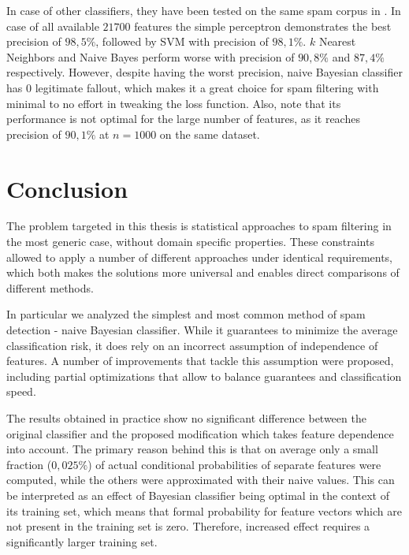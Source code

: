 \documentclass[12pt]{report}
\begin{document}
In case of other classifiers, they have been tested on the same spam corpus in \cite{Tretyakov}. In case of all available $21700$ features the simple perceptron demonstrates the best precision of $98,5\%$, followed by SVM with precision of $98,1\%$. $k$ Nearest Neighbors and Naive Bayes perform worse with precision of $90,8\%$ and $87,4\%$ respectively. However, despite having the worst precision, naive Bayesian classifier has $0$ legitimate fallout, which makes it a great choice for spam filtering with minimal to no effort in tweaking the loss function. Also, note that its performance is not optimal for the large number of features, as it reaches precision of $90,1\%$ at $n = 1000$ on the same dataset.

\newpage


\chapter*{Conclusion}

The problem targeted in this thesis is statistical approaches to spam filtering in the most generic case, without domain specific properties. These constraints allowed to apply a number of different approaches under identical requirements, which both makes the solutions more universal and enables direct comparisons of different methods.

In particular we analyzed the simplest and most common method of spam detection - naive Bayesian classifier. While it guarantees to minimize the average classification risk, it does rely on an incorrect assumption of independence of features. A number of improvements that tackle this assumption were proposed, including partial optimizations that allow to balance guarantees and classification speed.

The results obtained in practice show no significant difference between the original classifier and the proposed modification which takes feature dependence into account. The primary reason behind this is that on average only a small fraction ($0,025\%$) of actual conditional probabilities of separate features were computed, while the others were approximated with their naive values. This can be interpreted as an effect of Bayesian classifier being optimal in the context of its training set, which means that formal probability for feature vectors which are not present in the training set is zero. Therefore, increased effect requires a significantly larger training set.
\end{document}
